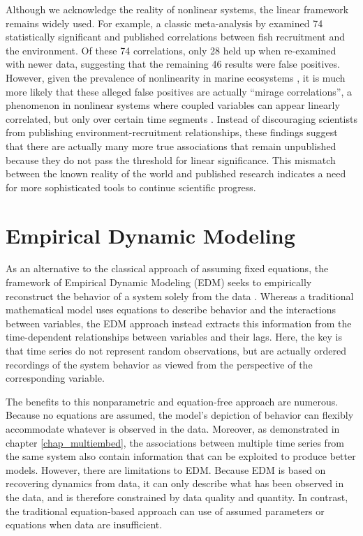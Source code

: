 Although we acknowledge the reality of nonlinear systems, the linear framework remains widely used. For example, a classic meta-analysis by \cite{Myers_1998} examined 74 statistically significant and published correlations between fish recruitment and the environment. Of these 74 correlations, only 28 held up when re-examined with newer data, suggesting that the remaining 46 results were false positives. However, given the prevalence of nonlinearity in marine ecosystems \cite{Hsieh_2005, Glaser_2014}, it is much more likely that these alleged false positives are actually ``mirage correlations'', a phenomenon in nonlinear systems where coupled variables can appear linearly correlated, but only over certain time segments \cite{Sugihara_2012}. Instead of discouraging scientists from publishing environment-recruitment relationships, these findings suggest that there are actually many more true associations that remain unpublished because they do not pass the threshold for linear significance. This mismatch between the known reality of the world and published research indicates a need for more sophisticated tools to continue scientific progress.

\section{Empirical Dynamic Modeling}

As an alternative to the classical approach of assuming fixed equations, the framework of Empirical Dynamic Modeling (EDM) seeks to empirically reconstruct the behavior of a system solely from the data \cite{Sugihara_1990, Sugihara_1994, Dixon_1999, Hsieh_2005, Sugihara_2012, Deyle_2013, Ye_2015}. Whereas a traditional mathematical model uses equations to describe behavior and the interactions between variables, the EDM approach instead extracts this information from the time-dependent relationships between variables and their lags. Here, the key is that time series do not represent random observations, but are actually ordered recordings of the system behavior as viewed from the perspective of the corresponding variable. 

The benefits to this nonparametric and equation-free approach are numerous. Because no equations are assumed, the model's depiction of behavior can flexibly accommodate whatever is observed in the data. Moreover, as demonstrated in chapter \ref{chap_multiembed}, the associations between multiple time series from the same system also contain information that can be exploited to produce better models. However, there are limitations to EDM. Because EDM is based on recovering dynamics from data, it can only describe what has been observed in the data, and is therefore constrained by data quality and quantity. In contrast, the traditional equation-based approach can use of assumed parameters or equations when data are insufficient.

